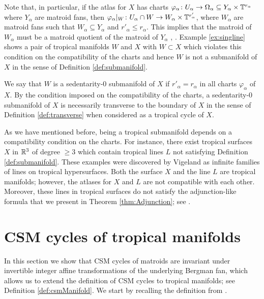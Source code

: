 Note that, in particular, if the atlas for $X$ has charts $\varphi_{\alpha} \colon U_{\alpha} \to \Omega_{\alpha} \subseteq Y_{\alpha} \times \mathbb{T}^{r_\alpha}$ where $Y_{\alpha}$ are matroid fans, then $\varphi_{\alpha}|_W \colon U_{\alpha} \cap W \to W_{\alpha} \times \mathbb{T}^{r'_\alpha}$, where $W_{\alpha}$ are matroid fans such that $W_{\alpha} \subseteq Y_{\alpha}$  and $r'_\alpha \leq r_\alpha$.  This implies that the matroid of $W_{\alpha}$ must be a matroid quotient of the matroid of $Y_{\alpha}$  \cite[Lemma 2.21]{ShawInt}, \cite[Proposition 3.3]{FrancoisRau}. Example \ref{ex:singline} shows a pair of tropical manifolds $W$ and $X$ with $W \subset X$ which violates this condition on the compatibility of the charts and hence $W$ is not a submanifold of $X$ in the sense of Definition \ref{def:submanifold}.


We say that $W$ is a sedentarity-$0$ submanifold of $X$ if $r'_\alpha=r_\alpha$ in all charts $\varphi_\alpha$ of $X$. By the condition imposed on the compatibility of the charts, a sedentarity-$0$ submanifold of $X$  is necessarily transverse to the boundary of $X$ in the sense of Definition \ref{def:transverse} when considered as a tropical cycle of $X$. 

\begin{exa*}\label{ex:singline}
As we have mentioned before, being a tropical submanifold depends on a compatibility condition on the charts. 
For instance, there exist tropical surfaces $X$ in $\mathbb{R}^3$ of degree $\geq 3$ which contain tropical lines $L$ not satisfying Definition \ref{def:submanifold}.
These examples were discovered by Vigeland \cite{Vig1} as infinite families of lines on tropical hypersurfaces.
Both the surface $X$ and the line $L$ are tropical manifolds;
however, the atlases for $X$ and $L$ are not compatible with each other. Moreover, these lines in tropical surfaces do not satisfy the adjunction-like formula that we present in Theorem \ref{thm:Adjunction};  see \cite[Section 7.3]{BrugalleShaw}. 
\end{exa*}







\setcounter{thm}{0}


\section{CSM cycles of tropical manifolds}

In this section we show that CSM cycles of matroids are invariant under invertible integer affine transformations of the underlying Bergman fan, which allows us to extend the definition of CSM cycles to tropical manifolds; see Definition \ref{def:csmManifold}. 
We start by recalling the definition from \cite{LdMRS}.


